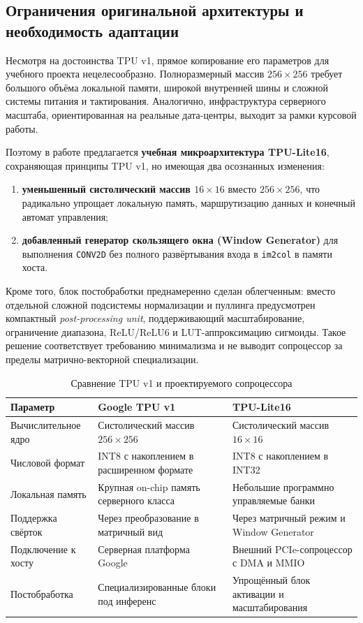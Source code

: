 \documentclass[12pt,a4paper]{article}
\begin{document}
\subsection{Ограничения оригинальной архитектуры и необходимость адаптации}

Несмотря на достоинства TPU v1, прямое копирование его параметров для учебного проекта нецелесообразно. Полноразмерный массив \(256 \times 256\) требует большого объёма локальной памяти, широкой внутренней шины и сложной системы питания и тактирования. Аналогично, инфраструктура серверного масштаба, ориентированная на реальные дата-центры, выходит за рамки курсовой работы.

Поэтому в работе предлагается \textbf{учебная микроархитектура TPU-Lite16}, сохраняющая принципы TPU v1, но имеющая два осознанных изменения:
\begin{enumerate}
    \item \textbf{уменьшенный систолический массив \(16 \times 16\)} вместо \(256 \times 256\), что радикально упрощает локальную память, маршрутизацию данных и конечный автомат управления;
    \item \textbf{добавленный генератор скользящего окна (Window Generator)} для выполнения \texttt{CONV2D} без полного развёртывания входа в \texttt{im2col} в памяти хоста.
\end{enumerate}

Кроме того, блок постобработки преднамеренно сделан облегченным: вместо отдельной сложной подсистемы нормализации и пуллинга предусмотрен компактный \textit{post-processing unit}, поддерживающий масштабирование, ограничение диапазона, ReLU/ReLU6 и LUT-аппроксимацию сигмоиды. Такое решение соответствует требованию минимализма и не выводит сопроцессор за пределы матрично-векторной специализации.

\begin{table}[H]
    \centering
    \caption{Сравнение TPU v1 и проектируемого сопроцессора}
    \begin{tabular}{|L{4.2cm}|L{4.7cm}|L{5.0cm}|}
        \hline
        \textbf{Параметр} & \textbf{Google TPU v1} & \textbf{TPU-Lite16} \\
        \hline
        Вычислительное ядро & Систолический массив \(256 \times 256\) & Систолический массив \(16 \times 16\) \\
        \hline
        Числовой формат & INT8 с накоплением в расширенном формате & INT8 с накоплением в INT32 \\
        \hline
        Локальная память & Крупная on-chip память серверного класса & Небольшие программно управляемые банки \\
        \hline
        Поддержка свёрток & Через преобразование в матричный вид & Через матричный режим и Window Generator \\
        \hline
        Подключение к хосту & Серверная платформа Google & Внешний PCIe-сопроцессор с DMA и MMIO \\
        \hline
        Постобработка & Специализированные блоки под инференс & Упрощённый блок активации и масштабирования \\
        \hline
    \end{tabular}
\end{table}
\end{document}
